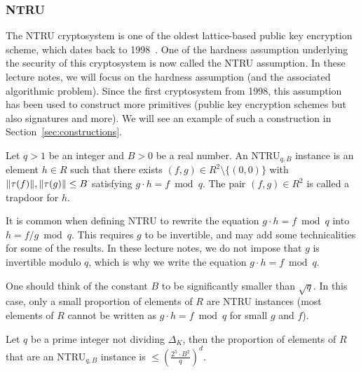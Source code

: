 


\subsubsection{NTRU}
The NTRU cryptosystem is one of the oldest lattice-based public key encryption scheme, which dates back to 1998~\cite{NTRU}. One of the hardness assumption underlying the security of this cryptosystem is now called the NTRU assumption. In these lecture notes, we will focus on the hardness assumption (and the associated algorithmic problem). Since the first cryptosystem from 1998, this assumption has been used to construct more primitives (public key encryption schemes but also signatures and more). We will see an example of such a construction in Section~\ref{sec:constructions}.

\begin{definition}
Let $q >1$ be an integer and $B >0$ be a real number. An NTRU$_{q,B}$ instance is an element $h \in R$ such that there exists $(f,g) \in R^2\setminus \{(0,0)\}$ with $\|\tau(f)\|, \|\tau(g)\| \leq B$ satisfying $g \cdot h = f \bmod q$. The pair $(f,g) \in R^2$ is called a trapdoor for $h$.
\end{definition}

It is common when defining NTRU to rewrite the equation $g \cdot h = f \bmod q$ into $h = f/g \bmod q$. This requires $g$ to be invertible, and may add some technicalities for some of the results. In these lecture notes, we do not impose that $g$ is invertible modulo $q$, which is why we write the equation $g \cdot h = f \bmod q$.

One should think of the constant $B$ to be significantly smaller than $\sqrt{q}$. In this case, only a small proportion of elements of $R$ are NTRU instances (most elements of $R$ cannot be written as $g \cdot h = f \bmod q$ for small $g$ and $f$).

\begin{lemma}
Let $q$ be a prime integer not dividing $\Delta_K$, then the proportion of elements of $R$ that are an NTRU$_{q,B}$ instance is $\leq \left( \frac{2^5 \cdot B^2}{q}\right)^d$.
\end{lemma}

